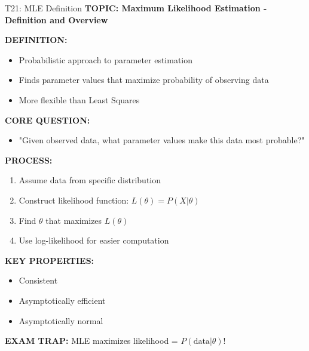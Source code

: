 \documentclass[8pt]{beamer}
\begin{document}
	\begin{frame}{T21: MLE Definition}
		\fontsize{6.5}{7.5}\selectfont
		\textbf{TOPIC: Maximum Likelihood Estimation - Definition and Overview}
		
		\vspace{0.1cm}
		\textbf{DEFINITION:}
		\begin{itemize}
			\item Probabilistic approach to parameter estimation
			\item Finds parameter values that maximize probability of observing data
			\item More flexible than Least Squares
		\end{itemize}
		
		\vspace{0.1cm}
		\textbf{CORE QUESTION:}
		\begin{itemize}
			\item "Given observed data, what parameter values make this data most probable?"
		\end{itemize}
		
		\vspace{0.1cm}
		\textbf{PROCESS:}
		\begin{enumerate}
			\item Assume data from specific distribution
			\item Construct likelihood function: $L(\theta) = P(X|\theta)$
			\item Find $\theta$ that maximizes $L(\theta)$
			\item Use log-likelihood for easier computation
		\end{enumerate}
		
		\vspace{0.1cm}
		\textbf{KEY PROPERTIES:}
		\begin{itemize}
			\item Consistent
			\item Asymptotically efficient
			\item Asymptotically normal
		\end{itemize}
		
		\textcolor{myred}{\textbf{EXAM TRAP:}} MLE maximizes \textcolor{myblue}{likelihood} = $P(\text{data}|\theta)$!
	\end{frame}
	
\end{document}
